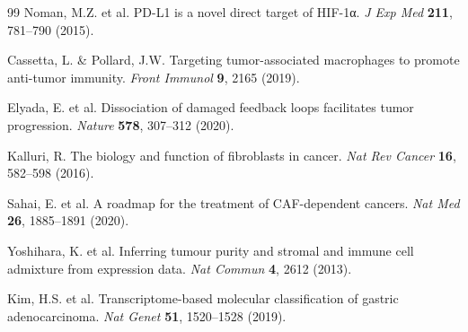 \documentclass[12pt,twoside]{article}
\begin{document}
\begin{thebibliography}{99}
 Noman, M.Z. et al. PD-L1 is a novel direct target of HIF-1α. \textit{J Exp Med} \textbf{211}, 781--790 (2015).

 Cassetta, L. \& Pollard, J.W. Targeting tumor-associated macrophages to promote anti-tumor immunity. \textit{Front Immunol} \textbf{9}, 2165 (2019).

 Elyada, E. et al. Dissociation of damaged feedback loops facilitates tumor progression. \textit{Nature} \textbf{578}, 307--312 (2020).

 Kalluri, R. The biology and function of fibroblasts in cancer. \textit{Nat Rev Cancer} \textbf{16}, 582--598 (2016).

 Sahai, E. et al. A roadmap for the treatment of CAF-dependent cancers. \textit{Nat Med} \textbf{26}, 1885--1891 (2020).

 Yoshihara, K. et al. Inferring tumour purity and stromal and immune cell admixture from expression data. \textit{Nat Commun} \textbf{4}, 2612 (2013).

 Kim, H.S. et al. Transcriptome-based molecular classification of gastric adenocarcinoma. \textit{Nat Genet} \textbf{51}, 1520--1528 (2019).

\end{thebibliography}

\end{document}
